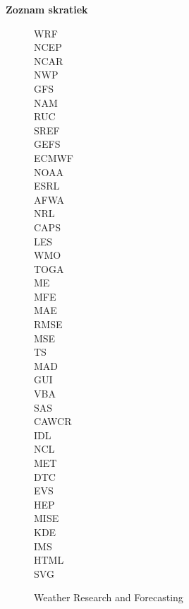 \eject
\begin{Huge}
\noindent\textbf{Zoznam skratiek} 
\end{Huge}


\begin{figure}[!h]
		\bigskip
		\bigskip
		\hspace{0.5cm}
		\begin{minipage}[h]{0.1\textwidth}
		  WRF \\
		  NCEP \\
		  NCAR \\
		  NWP \\
		  GFS \\
		  NAM \\
		  RUC \\
		  SREF \\
		  GEFS \\
		  ECMWF \\
		  NOAA \\
		  ESRL \\
		  AFWA \\
		  NRL \\
		  CAPS \\
		  LES \\
		  WMO \\
		  TOGA \\
		  ME \\
		  MFE \\
		  MAE \\
		  RMSE \\
		  MSE \\
		  TS \\
		  MAD \\
		  GUI \\
		  VBA \\
		  SAS \\
		  CAWCR \\
		  IDL \\
		  NCL \\
		  MET \\
		  DTC \\
		  EVS \\
		  HEP \\
		  MISE \\
		  KDE \\
		  IMS \\
		  HTML \\
		  SVG \\
		\end{minipage}
		\begin{minipage}[h]{0.8\textwidth}
		  Weather Research and Forecasting \\

\end{minipage}
\end{figure}
